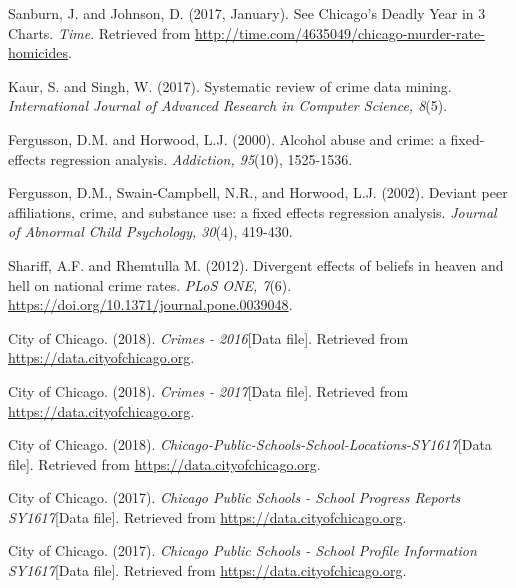 \documentclass[12pt]{article}
\begin{document}
	\newpage
	\begin{thebibliography}{10}
	
Sanburn, J. and Johnson, D. (2017, January). See Chicago's Deadly Year in 3 Charts. \textit{Time}. Retrieved from \href{http://time.com/4635049/chicago-murder-rate-homicides}{http://time.com/4635049/chicago-murder-rate-homicides}.

Kaur, S. and Singh, W. (2017). Systematic review of crime data mining. \textit{International Journal of Advanced Research in Computer Science, 8}(5).

Fergusson, D.M. and Horwood, L.J. (2000). Alcohol abuse and crime: a fixed-effects regression analysis. \textit{Addiction, 95}(10), 1525-1536.

Fergusson, D.M., Swain-Campbell, N.R., and Horwood, L.J. (2002). Deviant peer affiliations, crime, and substance use: a fixed effects regression analysis. \textit{Journal of Abnormal Child Psychology, 30}(4), 419-430.

Shariff, A.F. and Rhemtulla M. (2012). Divergent effects of beliefs in heaven and hell on national crime rates. \textit{PLoS ONE, 7}(6). \href{https://doi.org/10.1371/journal.pone.0039048}{https://doi.org/10.1371/journal.pone.0039048}.

City of Chicago. (2018). \textit{Crimes - 2016}[Data file]. Retrieved from \href{https://data.cityofchicago.org}{https://data.cityofchicago.org}.

City of Chicago. (2018). \textit{Crimes - 2017}[Data file]. Retrieved from \href{https://data.cityofchicago.org}{https://data.cityofchicago.org}.

City of Chicago. (2018). \textit{Chicago-Public-Schools-School-Locations-SY1617}[Data file]. Retrieved from \href{https://data.cityofchicago.org}{https://data.cityofchicago.org}.

City of Chicago. (2017). \textit{Chicago Public Schools - School Progress Reports SY1617}[Data file]. Retrieved from \href{https://data.cityofchicago.org}{https://data.cityofchicago.org}.

City of Chicago. (2017). \textit{Chicago Public Schools - School Profile Information SY1617}[Data file]. Retrieved from \href{https://data.cityofchicago.org}{https://data.cityofchicago.org}.

	\end{thebibliography}
\end{document}
